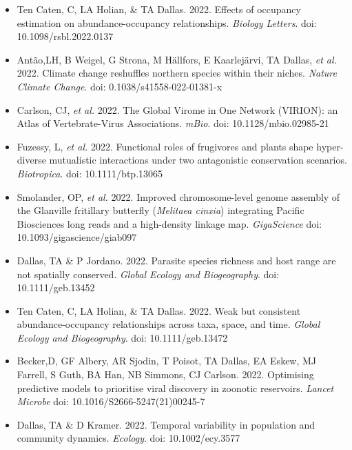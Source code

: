\documentclass[]{CV}
\begin{document}
\begin{itemize}

\item Ten Caten, C, LA Holian, \& {\mefont TA Dallas}. 2022. Effects of occupancy estimation on abundance-occupancy relationships. \textit{Biology Letters}. doi: 10.1098/rsbl.2022.0137

\item Antão,LH, B Weigel, G Strona, M Hällfors, E Kaarlejärvi, {\mefont TA Dallas}, \textit{et al.} 2022. Climate change reshuffles northern species within their niches. \textit{Nature Climate Change}. doi: 0.1038/s41558-022-01381-x

\item Carlson, CJ, \textit{et al.} 2022. The Global Virome in One Network (VIRION): an Atlas of Vertebrate-Virus Associations. \textit{mBio}. doi: 10.1128/mbio.02985-21

\item Fuzessy, L, \textit{et al.} 2022. Functional roles of frugivores and plants shape hyper-diverse mutualistic interactions under two antagonistic conservation scenarios. \textit{Biotropica}. doi: 10.1111/btp.13065

\item Smolander, OP, \textit{et al.} 2022. Improved chromosome-level genome assembly of the Glanville fritillary butterfly (\textit{Melitaea cinxia}) integrating Pacific Biosciences long reads and a high-density linkage map. \textit{GigaScience} doi: 10.1093/gigascience/giab097

\item {\mefont Dallas, TA} \& P Jordano. 2022. Parasite species richness and host range are not spatially conserved. \textit{Global Ecology and Biogeography}. doi: 10.1111/geb.13452

\item Ten Caten, C, LA Holian, \& {\mefont TA Dallas}. 2022. Weak but consistent abundance-occupancy relationships across taxa, space, and time. \textit{Global Ecology and Biogeography}. doi: 10.1111/geb.13472

\item Becker,D, GF Albery, AR Sjodin, T Poisot, {\mefont TA Dallas}, EA Eskew, MJ Farrell, S Guth, BA Han, NB Simmons, CJ Carlson. 2022. Optimising predictive models to prioritise viral discovery in zoonotic reservoirs. \textit{Lancet Microbe} doi: 10.1016/S2666-5247(21)00245-7

\item {\mefont Dallas, TA} \& D Kramer. 2022. Temporal variability in population and community dynamics. \textit{Ecology}. doi: 10.1002/ecy.3577


\end{itemize}
\end{document}
